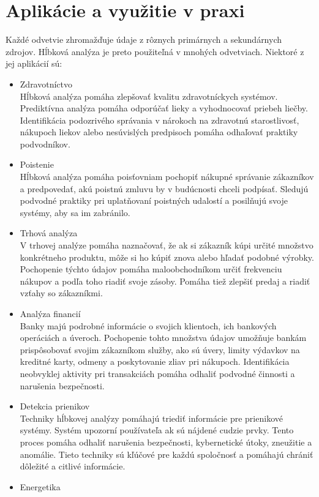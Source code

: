 \documentclass[10pt,twoside,slovak,a4paper]{article}
\begin{document}
\section{Aplikácie a využitie v praxi}
Každé odvetvie zhromažďuje údaje z rôznych primárnych a sekundárnych zdrojov. Hĺbková analýza je preto použiteľná v mnohých odvetviach. Niektoré z jej aplikácií sú:
\begin{itemize}
\item Zdravotníctvo\\
Hĺbková analýza pomáha zlepšovať kvalitu zdravotníckych systémov. Prediktívna analýza pomáha odporúčať lieky a vyhodnocovať priebeh liečby. Identifikácia podozrivého správania v nárokoch na zdravotnú starostlivosť, nákupoch liekov alebo nesúvislých predpisoch pomáha odhaľovať praktiky podvodníkov.
\item Poistenie\\
Hĺbková analýza pomáha poisťovniam pochopiť nákupné správanie zákazníkov a predpovedať, akú poistnú zmluvu by v budúcnosti chceli podpísať. Sledujú podvodné praktiky pri uplatňovaní poistných udalostí a posilňujú svoje systémy, aby sa im zabránilo. 
\item Trhová analýza\\
V trhovej analýze pomáha naznačovať, že ak si zákazník kúpi určité množstvo konkrétneho produktu, môže si ho kúpiť znova alebo hľadať podobné výrobky. Pochopenie týchto údajov pomáha maloobchodníkom určiť frekvenciu nákupov a podľa toho riadiť svoje zásoby. Pomáha tiež zlepšiť predaj a riadiť vzťahy so zákazníkmi.
\item Analýza financií\\
Banky majú podrobné informácie o svojich klientoch, ich bankových operáciách a úveroch. Pochopenie tohto množstva údajov umožňuje bankám prispôsobovať svojim zákazníkom služby, ako sú úvery, limity výdavkov na kreditné karty, odmeny a poskytovanie zliav pri nákupoch. Identifikácia neobvyklej aktivity pri transakciách pomáha odhaliť podvodné činnosti a narušenia bezpečnosti.
\item Detekcia prienikov\\
Techniky hĺbkovej analýzy pomáhajú triediť informácie pre prienikové systémy. Systém upozorní používateľa ak sú nájdené cudzie prvky. Tento proces pomáha odhaliť narušenia bezpečnosti, kybernetické útoky, zneužitie a anomálie. Tieto techniky sú kľúčové pre každú spoločnosť a pomáhajú chrániť dôležité a citlivé informácie.
\item Energetika\\

\end{itemize}
\end{document}
